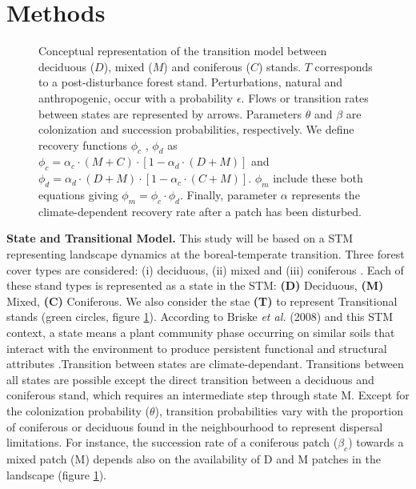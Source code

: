 \section{Methods}   

\begin{figure}
	
	\caption{Conceptual representation of the transition model between deciduous ($D$),
	mixed ($M$) and coniferous ($C$) stands. $T$ corresponds to a post-disturbance forest stand. Perturbations, natural and anthropogenic, occur with a probability $\epsilon$. 
	Flows or transition rates between states are represented by arrows.
	Parameters $\theta$ and $\beta$ are  colonization and succession probabilities,
	respectively. We define recovery functions $\phi_c$ , $\phi_d$ as $\phi_c
	= \alpha_c \cdot (M+C) \cdot [1- \alpha_d \cdot (D+M)]$ and $\phi_d =
	\alpha_d \cdot (D+M) \cdot [1- \alpha_c \cdot (C+M)]$. $\phi_m$ include these both equations giving $\phi_m = \phi_c \cdot \phi_d$. Finally, parameter $\alpha$ represents the climate-dependent recovery rate after a patch has been disturbed.}
	\label{Model}
	\vspace{-1em}
\end{figure}


%


\textbf{State and Transitional Model.} This study will be based on a
STM representing landscape dynamics at the boreal-temperate transition. Three 
forest cover types are considered: (i) deciduous, (ii) mixed and (iii)
coniferous \cite{Fisichelli2013}.  Each of these stand types is represented as
a state in the STM: \textbf{(D)} Deciduous, \textbf{(M)} Mixed, \textbf{(C)}
Coniferous. We also consider the stae \textbf{(T)} to represent Transitional stands (green circles, figure \ref{Model}).  According to
Briske\textit{ et al.} (2008) and this STM context, a state means a plant
community phase occurring on similar soils that interact with the environment
to produce persistent functional and structural attributes \cite{Briske2008}.Transition between states are climate-dependant. Transitions
between all states are possible except the direct transition between a
deciduous and coniferous stand, which requires an intermediate step through
state M. Except for the colonization probability ($\theta$), transition probabilities vary
with the proportion of coniferous or deciduous found in the 
neighbourhood to represent dispersal limitations. For instance, the succession rate of a coniferous patch
($\beta_c$) towards a mixed patch (M) depends also on the availability of D
and M patches in the landscape (figure \ref{Model}). 

